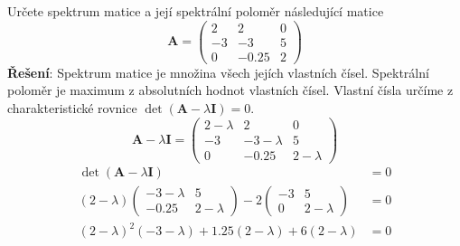       \begin{example}
        Určete spektrum matice a její spektrální poloměr následující matice
        \begin{equation*}\label{pr:spektrum_matice}
          \mathbf{A} =
          \left(
            \begin{array}{ccc}
              2  &  2    & 0 \\
             -3  & -3    & 5 \\
              0  & -0.25 & 2
            \end{array}
          \right)
        \end{equation*}
      \textbf{Řešení}: Spektrum matice je množina všech jejích vlastních čísel. Spektrální poloměr je
        maximum z absolutních hodnot vlastních čísel. Vlastní čísla určí\-me z charakteristické
        rovnice $\det(\mathbf{A}-\lambda \mathbf{I})=0$.    
        \begin{equation*}
          \textbf{A} - \lambda\textbf{I}=\left(\begin{array}{ccc}
                                                  2-\lambda  &  2          & 0 \\
                                                 -3          & -3-\lambda  & 5 \\
                                                  0          & -0.25       & 2-\lambda
                                               \end{array}
                                         \right)
        \end{equation*}
        \begin{align}
          \det(\mathbf{A}-\lambda \mathbf{I})                    &= 0           \nonumber\\
          (2-\lambda)\left(\begin{array}{cc}
                              -3-\lambda  &  5\\
                              -0.25    & 2-\lambda
                           \end{array}\right) -2\left(
                           \begin{array}{cc}
                              -3       &  5\\
                               0       & 2-\lambda
                           \end{array}\right)                   &= 0           \nonumber\\
          (2-\lambda)^2(-3-\lambda)+1.25(2-\lambda)+6(2-\lambda) &= 0           \nonumber\\

\end{align}
\end{example}
